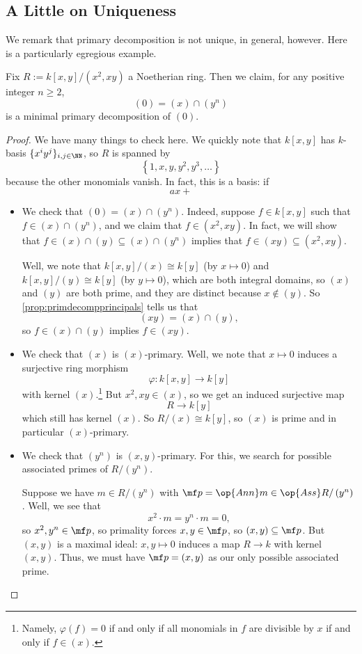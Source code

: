 \subsection{A Little on Uniqueness}
We remark that primary decomposition is not unique, in general, however. Here is a particularly egregious example.
\begin{exe}
	Fix $R:=k[x,y]/\left(x^2,xy\right)$ a Noetherian ring. Then we claim, for any positive integer $n\ge2$,
	\[(0)=(x)\cap\left(y^n\right)\]
	is a minimal primary decomposition of $(0)$.
\end{exe}
\begin{proof}
	We have many things to check here. We quickly note that $k[x,y]$ has $k$-basis $\{x^iy^j\}_{i,j\in\NN}$, so $R$ is spanned by
	\[\left\{1,x,y,y^2,y^3,\ldots\right\}\]
	because the other monomials vanish. In fact, this is a basis: if
	\[ax+\]
	\begin{itemize}
		\item We check that $(0)=(x)\cap\left(y^n\right)$. Indeed, suppose $f\in k[x,y]$ such that $f\in(x)\cap\left(y^n\right)$, and we claim that $f\in\left(x^2,xy\right)$. In fact, we will show that $f\in(x)\cap(y)\subseteq(x)\cap\left(y^n\right)$ implies that $f\in(xy)\subseteq\left(x^2,xy\right)$.
		
		Well, we note that $k[x,y]/(x)\cong k[y]$ (by $x\mapsto0$) and $k[x,y]/(y)\cong k[y]$ (by $y\mapsto0$), which are both integral domains, so $(x)$ and $(y)$ are both prime, and they are distinct because $x\notin(y)$. So \autoref{prop:primdecompprincipals} tells us that
		\[(xy)=(x)\cap(y),\]
		so $f\in(x)\cap(y)$ implies $f\in(xy)$.

		\item We check that $(x)$ is $(x)$-primary. Well, we note that $x\mapsto0$ induces a surjective ring morphism
		\[\varphi:k[x,y]\to k[y]\]
		with kernel $(x)$.\footnote{Namely, $\varphi(f)=0$ if and only if all monomials in $f$ are divisible by $x$ if and only if $f\in(x)$.} But $x^2,xy\in(x)$, so we get an induced surjective map
		\[R\to k[y]\]
		which still has kernel $(x)$. So $R/(x)\cong k[y]$, so $(x)$ is prime and in particular $(x)$-primary.

		\item We check that $\left(y^n\right)$ is $(x,y)$-primary. For this, we search for possible associated primes of $R/\left(y^n\right)$.
		
		Suppose we have $m\in R/\left(y^n\right)$ with $\mf p=\op{Ann}m\in\op{Ass}R/\left(y^n\right)$. Well, we see that
		\[x^2\cdot m=y^n\cdot m=0,\]
		so $x^2,y^n\in\mf p$, so primality forces $x,y\in\mf p$, so $(x,y)\subseteq\mf p$. But $(x,y)$ is a maximal ideal: $x,y\mapsto0$ induces a map $R\to k$ with kernel $(x,y)$. Thus, we must have $\mf p=(x,y)$ as our only possible associated prime.


\end{itemize}
\end{proof}
